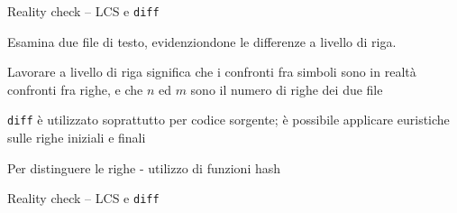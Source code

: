 \begin{frame}{Reality check -- LCS e \texttt{diff}  }

\vspace{-9pt}
\BIL
\item Esamina due file di testo, evidenziondone le differenze a livello di riga. 
\item Lavorare \alert{a livello di riga} significa che i confronti fra simboli sono in realtà confronti fra righe, e che $n$ ed $m$ sono il numero di righe dei due file
\EIL

\BIL
\item \texttt{diff} è utilizzato soprattutto per codice sorgente; è possibile applicare euristiche sulle righe iniziali e finali
\item Per distinguere le righe - utilizzo di funzioni hash
\EIL

\end{frame}

\begin{frame}{Reality check -- LCS e \texttt{diff}  }

\vspace{-9pt}

\end{frame}







